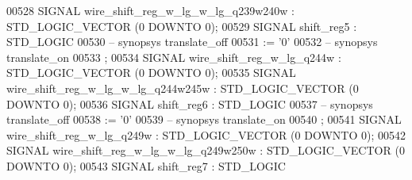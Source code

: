 \begin{DoxyCode}
{00528      \textcolor{keywordflow}{SIGNAL}  \textcolor{vhdlchar}{wire_shift_reg_w_lg_w_lg_q239w240w} \textcolor{vhdlchar}{:}   \textcolor{comment}{STD\_LOGIC\_VECTOR} \textcolor{vhdlchar}{(}\textcolor{vhdllogic}{}\textcolor{vhdllogic}{0} \textcolor{keywordflow}{DOWNTO} \textcolor{vhdllogic}{}\textcolor{vhdllogic}{0}\textcolor{vhdlchar}{)};
00529      \textcolor{keywordflow}{SIGNAL}  \textcolor{vhdlchar}{shift_reg5} \textcolor{vhdlchar}{:}   \textcolor{comment}{STD\_LOGIC}
00530 \textcolor{keyword}{     -- synopsys translate\_off}
00531       \textcolor{vhdlchar}{:=} \textcolor{vhdlchar}{'}\textcolor{vhdllogic}{}\textcolor{vhdllogic}{0}\textcolor{vhdlchar}{'}
00532 \textcolor{keyword}{     -- synopsys translate\_on}
00533      ;
00534      \textcolor{keywordflow}{SIGNAL}  \textcolor{vhdlchar}{wire_shift_reg_w_lg_q244w}  \textcolor{vhdlchar}{:}   \textcolor{comment}{STD\_LOGIC\_VECTOR} \textcolor{vhdlchar}{(}\textcolor{vhdllogic}{}\textcolor{vhdllogic}{0} \textcolor{keywordflow}{DOWNTO} \textcolor{vhdllogic}{}\textcolor{vhdllogic}{0}\textcolor{vhdlchar}{)};
00535      \textcolor{keywordflow}{SIGNAL}  \textcolor{vhdlchar}{wire_shift_reg_w_lg_w_lg_q244w245w} \textcolor{vhdlchar}{:}   \textcolor{comment}{STD\_LOGIC\_VECTOR} \textcolor{vhdlchar}{(}\textcolor{vhdllogic}{}\textcolor{vhdllogic}{0} \textcolor{keywordflow}{DOWNTO} \textcolor{vhdllogic}{}\textcolor{vhdllogic}{0}\textcolor{vhdlchar}{)};
00536      \textcolor{keywordflow}{SIGNAL}  \textcolor{vhdlchar}{shift_reg6} \textcolor{vhdlchar}{:}   \textcolor{comment}{STD\_LOGIC}
00537 \textcolor{keyword}{     -- synopsys translate\_off}
00538       \textcolor{vhdlchar}{:=} \textcolor{vhdlchar}{'}\textcolor{vhdllogic}{}\textcolor{vhdllogic}{0}\textcolor{vhdlchar}{'}
00539 \textcolor{keyword}{     -- synopsys translate\_on}
00540      ;
00541      \textcolor{keywordflow}{SIGNAL}  \textcolor{vhdlchar}{wire_shift_reg_w_lg_q249w}  \textcolor{vhdlchar}{:}   \textcolor{comment}{STD\_LOGIC\_VECTOR} \textcolor{vhdlchar}{(}\textcolor{vhdllogic}{}\textcolor{vhdllogic}{0} \textcolor{keywordflow}{DOWNTO} \textcolor{vhdllogic}{}\textcolor{vhdllogic}{0}\textcolor{vhdlchar}{)};
00542      \textcolor{keywordflow}{SIGNAL}  \textcolor{vhdlchar}{wire_shift_reg_w_lg_w_lg_q249w250w} \textcolor{vhdlchar}{:}   \textcolor{comment}{STD\_LOGIC\_VECTOR} \textcolor{vhdlchar}{(}\textcolor{vhdllogic}{}\textcolor{vhdllogic}{0} \textcolor{keywordflow}{DOWNTO} \textcolor{vhdllogic}{}\textcolor{vhdllogic}{0}\textcolor{vhdlchar}{)};
00543      \textcolor{keywordflow}{SIGNAL}  \textcolor{vhdlchar}{shift_reg7} \textcolor{vhdlchar}{:}   \textcolor{comment}{STD\_LOGIC}
}
\end{DoxyCode}
